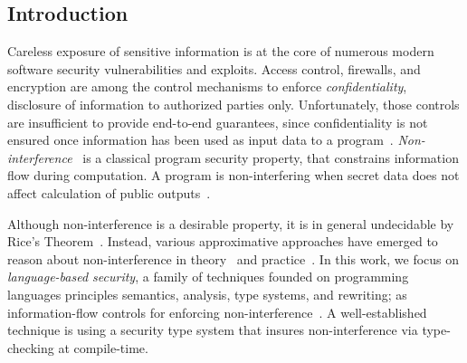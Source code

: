 \subsection{Introduction}
\label{plas-introduction}

Careless exposure of sensitive information is at the core of numerous modern software security vulnerabilities and exploits.
Access control, firewalls, and encryption are among the control mechanisms to enforce \emph{confidentiality}, \ie disclosure of information to  authorized parties only.
Unfortunately, those controls are insufficient to provide end-to-end guarantees, since confidentiality is not ensured once information has been used as input data to a program~\cite{zdancewic2004}.
\emph{Non-interference}~\cite{goguen1982} is a classical program security property, that constrains information flow during computation.
A program is non-interfering when secret data does not affect calculation of public outputs~\cite{sabelfeld2003}.

Although non-interference is a desirable property, it is in general undecidable by Rice's Theorem~\cite{rice1953}. %
Instead, various approximative approaches have emerged to reason about non-interference in theory~\cite{VolpanoI1996,abadi1999b,bowman2015} and practice~\cite{Myers1999,hammer2009,Broberg2013,arzt2014,huang2014}.
In this work, we focus on \emph{language-based security},
a family of techniques founded on programming languages principles \eg semantics, analysis, type systems, and rewriting;
as information-flow controls for enforcing non-interference~\cite{schneider2001,sabelfeld2003}.
A well-established technique %
is using a security type system that insures non-interference via type-checking at compile-time.

